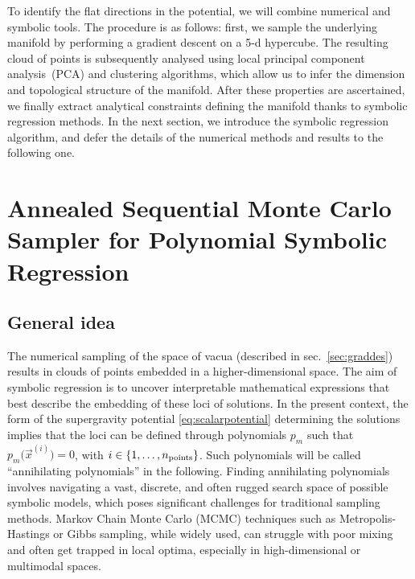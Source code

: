 \documentclass[11pt,a4paper]{article}
\begin{document}
To identify the flat directions in the potential, we will combine numerical and symbolic tools. The procedure is as follows: first, we sample the underlying manifold by performing a gradient descent on a 5-d hypercube. The resulting cloud of points is subsequently analysed using local principal component analysis~(PCA) and clustering algorithms, which allow us to infer the dimension and topological structure of the manifold. After these properties are ascertained, we finally extract analytical constraints defining the manifold thanks to symbolic regression methods. In the next section, we introduce the symbolic regression algorithm, and defer the details of the numerical methods and results to the following one.

\section{Annealed Sequential Monte Carlo Sampler for Polynomial Symbolic Regression} \label{Sec:AIS-SMC}

	\subsection{General idea}
	The numerical sampling of the space of vacua (described in sec.~\ref{sec:graddes}) results in clouds of points embedded in a higher-dimensional space. 
	The aim of symbolic regression is to uncover interpretable mathematical expressions that best describe the embedding of these loci of solutions. 
	In the present context, the form of the supergravity potential \eqref{eq:scalarpotential} determining the solutions implies that the loci can be defined through polynomials $p_{m}$ such that $p_{m}\big(\vec{x}^{(i)}\big) = 0$, with $i \in \{1, \dots, n_{\rm points}\}$. Such polynomials will be called ``annihilating polynomials'' in the following.
	Finding annihilating polynomials involves navigating a vast, discrete, and often rugged search space of possible symbolic models, which poses significant challenges for traditional sampling methods. 
	Markov Chain Monte Carlo (MCMC) techniques such as Metropolis-Hastings or Gibbs sampling, while widely used, can struggle with poor mixing and often get trapped in local optima, especially in high-dimensional or multimodal spaces.
\end{document}
